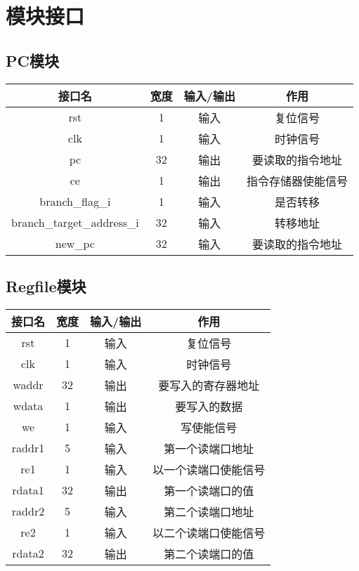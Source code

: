 \section{模块接口}
	\subsection{PC模块}
	\begin{table}[!hbp]
		\centering
		\begin{tabular}{|c|c|c|c|}
		\hline
		接口名&宽度&输入/输出&作用\\
		\hline
		rst &1& 输入& 复位信号\\
		\hline
		clk &1& 输入& 时钟信号\\
		\hline
		pc &32& 输出& 要读取的指令地址\\
		\hline
		ce &1& 输出& 指令存储器使能信号\\
		\hline
		branch{\_}flag{\_}i& 1& 输入& 是否转移\\
		\hline
		branch{\_}target{\_}address{\_}i& 32& 输入& 转移地址\\
		\hline
		new{\_}pc& 32& 输入& 要读取的指令地址\\
		\hline
		\end{tabular}
	\end{table}

	\subsection{Regfile模块}
	\begin{table}[!hbp]
		\centering
		\begin{tabular}{|c|c|c|c|}
		\hline
		接口名&宽度&输入/输出&作用\\
		\hline
		rst &1& 输入& 复位信号\\
		\hline
		clk &1& 输入& 时钟信号\\
		\hline
		waddr& 32& 输出& 要写入的寄存器地址\\
		\hline
		wdata& 1& 输出& 要写入的数据\\
		\hline
		we& 1& 输入& 写使能信号\\
		\hline
		raddr1& 5& 输入& 第一个读端口地址\\
		\hline
		re1& 1& 输入& 以一个读端口使能信号\\
		\hline
		rdata1& 32& 输出& 第一个读端口的值\\
		\hline
		raddr2& 5& 输入& 第二个读端口地址\\
		\hline
		re2& 1& 输入& 以二个读端口使能信号\\
		\hline
		rdata2& 32& 输出& 第二个读端口的值\\
		\hline
		\end{tabular}
	\end{table}
	
